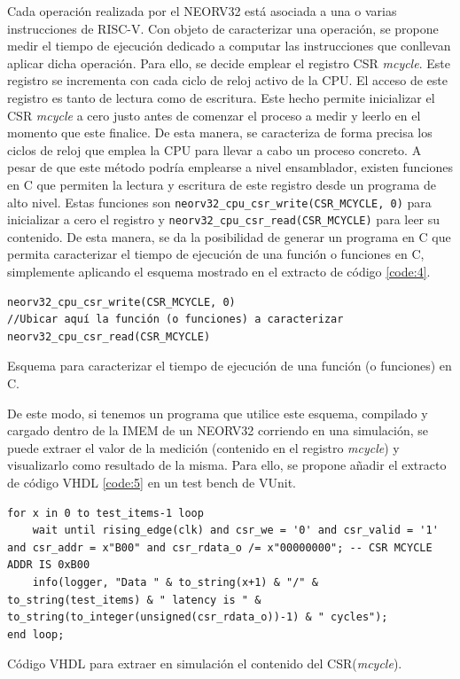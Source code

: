 Cada operación realizada por el NEORV32 está asociada a una o varias instrucciones de RISC-V.
Con objeto de caracterizar una operación, se propone medir el tiempo de ejecución dedicado a computar las instrucciones que conllevan aplicar dicha operación.
Para ello, se decide emplear el registro CSR \textit{mcycle}.
Este registro se incrementa con cada ciclo de reloj activo de la CPU.
El acceso de este registro es tanto de lectura como de escritura.
Este hecho permite inicializar el CSR \textit{mcycle} a cero justo antes de comenzar el proceso a medir y leerlo en el momento que este finalice.
De esta manera, se caracteriza de forma precisa los ciclos de reloj que emplea la CPU para llevar a cabo un proceso concreto.
A pesar de que este método podría emplearse a nivel ensamblador, existen funciones en C que permiten la lectura y escritura de este registro desde un programa de alto nivel.
Estas funciones son \texttt{neorv32_cpu_csr_write(CSR_MCYCLE, 0)} para inicializar a cero el registro y \texttt{neorv32_cpu_csr_read(CSR_MCYCLE)} para leer su contenido.
De esta manera, se da la posibilidad de generar un programa en C que permita caracterizar el tiempo de ejecución de una función o funciones en C, simplemente aplicando el esquema mostrado en el extracto de código \ref{code:4}.

\begin{code}
\begin{verbatim}
neorv32_cpu_csr_write(CSR_MCYCLE, 0)
//Ubicar aquí la función (o funciones) a caracterizar
neorv32_cpu_csr_read(CSR_MCYCLE)
\end{verbatim}
\caption{Esquema para caracterizar el tiempo de ejecución de una función (o funciones) en C.}
\label{code:4}
\end{code}

De este modo, si tenemos un programa que utilice este esquema, compilado y cargado dentro de la IMEM de un NEORV32 corriendo en una simulación, se puede extraer el valor de la medición (contenido en el registro \textit{mcycle}) y visualizarlo como resultado de la misma.
Para ello, se propone añadir el extracto de código VHDL \ref{code:5} en un test bench de VUnit.

\begin{code}
\begin{verbatim}
for x in 0 to test_items-1 loop
    wait until rising_edge(clk) and csr_we = '0' and csr_valid = '1' and csr_addr = x"B00" and csr_rdata_o /= x"00000000"; -- CSR MCYCLE ADDR IS 0xB00
    info(logger, "Data " & to_string(x+1) & "/" & to_string(test_items) & " latency is " & to_string(to_integer(unsigned(csr_rdata_o))-1) & " cycles");
end loop;
\end{verbatim}
\caption{Código VHDL para extraer en simulación el contenido del CSR(\textit{mcycle}).}
\label{code:5}
\end{code}

